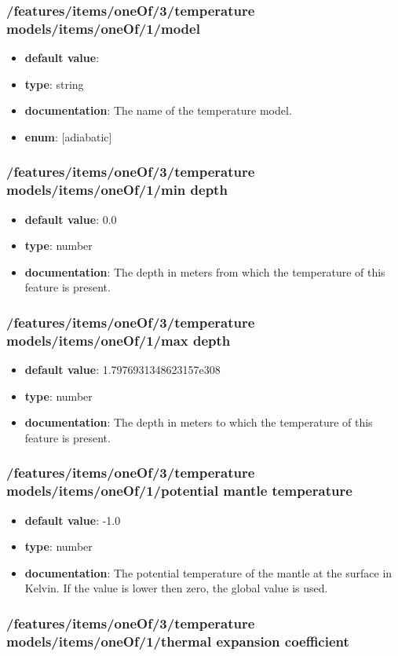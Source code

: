 \subsubsection{/features/items/oneOf/3/temperature models/items/oneOf/1/model}
\begin{itemize}\item {\bf default value}: 
\item {\bf type}: string
\item {\bf documentation}: The name of the temperature model.
\item {\bf enum}: [adiabatic]\end{itemize}\subsubsection{/features/items/oneOf/3/temperature models/items/oneOf/1/min depth}
\begin{itemize}\item {\bf default value}: 0.0
\item {\bf type}: number
\item {\bf documentation}: The depth in meters from which the temperature of this feature is present.
\end{itemize}\subsubsection{/features/items/oneOf/3/temperature models/items/oneOf/1/max depth}
\begin{itemize}\item {\bf default value}: 1.7976931348623157e308
\item {\bf type}: number
\item {\bf documentation}: The depth in meters to which the temperature of this feature is present.
\end{itemize}\subsubsection{/features/items/oneOf/3/temperature models/items/oneOf/1/potential mantle temperature}
\begin{itemize}\item {\bf default value}: -1.0
\item {\bf type}: number
\item {\bf documentation}: The potential temperature of the mantle at the surface in Kelvin. If the value is lower then zero, the global value is used.
\end{itemize}\subsubsection{/features/items/oneOf/3/temperature models/items/oneOf/1/thermal expansion coefficient}
